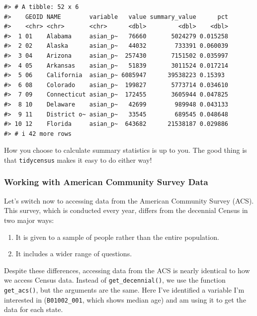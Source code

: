 \documentclass[
]{book}
\providecommand{\tightlist}{%
  \setlength{\itemsep}{0pt}\setlength{\parskip}{0pt}}
\begin{document}
\begin{verbatim}
#> # A tibble: 52 x 6
#>    GEOID NAME        variable   value summary_value      pct
#>    <chr> <chr>       <chr>      <dbl>         <dbl>    <dbl>
#>  1 01    Alabama     asian_p~   76660       5024279 0.015258
#>  2 02    Alaska      asian_p~   44032        733391 0.060039
#>  3 04    Arizona     asian_p~  257430       7151502 0.035997
#>  4 05    Arkansas    asian_p~   51839       3011524 0.017214
#>  5 06    California  asian_p~ 6085947      39538223 0.15393 
#>  6 08    Colorado    asian_p~  199827       5773714 0.034610
#>  7 09    Connecticut asian_p~  172455       3605944 0.047825
#>  8 10    Delaware    asian_p~   42699        989948 0.043133
#>  9 11    District o~ asian_p~   33545        689545 0.048648
#> 10 12    Florida     asian_p~  643682      21538187 0.029886
#> # i 42 more rows
\end{verbatim}

How you choose to calculate summary statistics is up to you. The good thing is that \texttt{tidycensus} makes it easy to do either way!

\hypertarget{working-with-american-community-survey-data}{%
\subsubsection*{Working with American Community Survey Data}\label{working-with-american-community-survey-data}}

Let's switch now to accessing data from the American Community Survey (ACS). This survey, which is conducted every year, differs from the decennial Census in two major ways:

\begin{enumerate}
\def\labelenumi{\arabic{enumi}.}
\tightlist
\item
  It is given to a sample of people rather than the entire population.
\item
  It includes a wider range of questions.
\end{enumerate}

Despite these differences, accessing data from the ACS is nearly identical to how we access Census data. Instead of \texttt{get\_decennial()}, we use the function \texttt{get\_acs()}, but the arguments are the same. Here I've identified a variable I'm interested in (\texttt{B01002\_001}, which shows median age) and am using it to get the data for each state.
\end{document}

